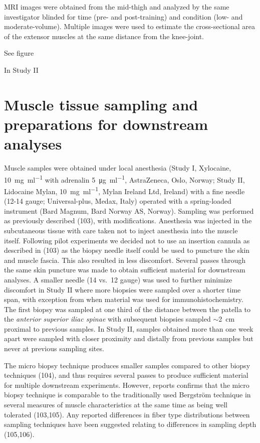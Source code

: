 \documentclass[twoside,10pt]{gihclass} %
\begin{document}
MRI images were obtained from the mid-thigh and analyzed by the same
investigator blinded for time (pre- and post-training) and condition
(low- and moderate-volume). Multiple images were used to estimate the
cross-sectional area of the extensor muscles at the same distance from
the knee-joint.

See figure

In Study II

\hypertarget{muscle-tissue-sampling-and-preparations-for-downstream-analyses}{%
\section{Muscle tissue sampling and preparations for downstream analyses}\label{muscle-tissue-sampling-and-preparations-for-downstream-analyses}}

Muscle samples were obtained under local anesthesia (Study I, Xylocaine,
\SI{10}{\mg\per\ml} with adrenalin \SI{5}{\micro\gram\per\ml},
AstraZeneca, Oslo, Norway; Study II, Lidocaine Mylan,
\SI{10}{\mg\per\ml}, Mylan Ireland Ltd, Ireland) with a fine needle
(12-14 gauge; Universal-plus, Medax, Italy) operated with a
spring-loaded instrument (Bard Magnum, Bard Norway AS, Norway). Sampling
was performed as previously described
(103), with
modifications. Anesthesia was injected in the subcutaneous tissue with
care taken not to inject anesthesia into the muscle itself. Following
pilot experiments we decided not to use an insertion cannula as
described in (103) as the biopsy needle itself could be used to
puncture the skin and muscle fascia. This also resulted in less
discomfort. Several passes through the same skin puncture was made to
obtain sufficient material for downstream analyses. A smaller needle (14
vs.~12 gauge) was used to further minimize discomfort in Study II where
more biopsies were sampled over a shorter time span, with exception from
when material was used for immunohistochemistry. The first biopsy was
sampled at one third of the distance between the patella to the
\emph{anterior superior iliac spinae} with subsequent biopsies sampled
\(\sim\)\SI{2}{cm} proximal to previous samples. In Study II, samples
obtained more than one week apart were sampled with closer proximity and
distally from previous samples but never at previous sampling sites.

The micro biopsy technique produces smaller samples compared to other
biopsy techniques
(104), and thus
requires several passes to produce sufficient material for multiple
downstream experiments. However, reports confirms that the micro biopsy
technique is comparable to the traditionally used Bergström technique in
several measures of muscle characteristics at the same time as being
well tolerated (103,105). Any reported differences in fiber type
distributions between sampling techniques have been suggested relating
to differences in sampling depth (105,106).
\end{document}
